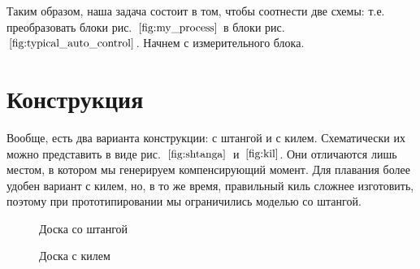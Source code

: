 \documentclass[12pt,a4paper]{article}
\begin{document}
Таким образом, наша задача состоит в том, чтобы соотнести две схемы: т.е. преобразовать блоки рис.~$\ref{fig:my_process}$ в блоки рис.~$\ref{fig:typical_auto_control}$.
Начнем с измерительного блока.

\section{Конструкция}

Вообще, есть два варианта конструкции: с штангой и с килем. Схематически их можно представить в виде рис.~$\ref{fig:shtanga}$~и~$\ref{fig:kil}$. Они отличаются лишь местом, в котором мы генерируем компенсирующий момент. Для плавания более удобен вариант с килем, но, в то же время, правильный киль сложнее изготовить, поэтому при прототипировании мы ограничились моделью со штангой.

\begin{figure}[h!]
	\caption{Доска со штангой}
	\label{fig:shtanga}
\end{figure}

\begin{figure}[h!]
	\caption{Доска с килем}
	\label{fig:kil}
\end{figure}
\end{document}
